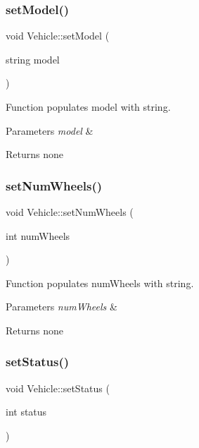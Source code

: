 \subsubsection{\texorpdfstring{set\+Model()}{setModel()}}
{\footnotesize\ttfamily void Vehicle\+::set\+Model (\begin{DoxyParamCaption}\item[{string}]{model }\end{DoxyParamCaption})}

Function populates model with string. 
\begin{DoxyParams}{Parameters}
{\em model} & \\
\hline
\end{DoxyParams}
\begin{DoxyReturn}{Returns}
none 
\end{DoxyReturn}
\mbox{\label{class_vehicle_a91f4ad00bfe3d0d330632caf3c1fe77a}} 
\subsubsection{\texorpdfstring{set\+Num\+Wheels()}{setNumWheels()}}
{\footnotesize\ttfamily void Vehicle\+::set\+Num\+Wheels (\begin{DoxyParamCaption}\item[{int}]{num\+Wheels }\end{DoxyParamCaption})}

Function populates num\+Wheels with string. 
\begin{DoxyParams}{Parameters}
{\em num\+Wheels} & \\
\hline
\end{DoxyParams}
\begin{DoxyReturn}{Returns}
none 
\end{DoxyReturn}
\mbox{\label{class_vehicle_aa547452a11bfd2b20c79b7ee72309a00}} 
\subsubsection{\texorpdfstring{set\+Status()}{setStatus()}}
{\footnotesize\ttfamily void Vehicle\+::set\+Status (\begin{DoxyParamCaption}\item[{int}]{status }\end{DoxyParamCaption})}

